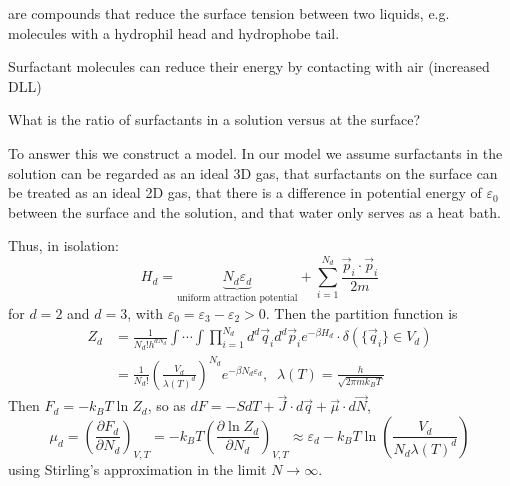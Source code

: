 \documentclass[12pt, a4paper, oneside, openright, titlepage]{book}
\begin{document}
\begin{defn}
     are compounds that reduce the surface tension between two liquids, e.g. molecules with a hydrophil head and hydrophobe tail.
\end{defn}

Surfactant molecules can reduce their energy by contacting with air (increased DLL)

\begin{qst}
    What is the ratio of surfactants in a solution versus at the surface?
\end{qst}

To answer this we construct a model. In our model we assume surfactants in the solution can be regarded as an ideal 3D gas, that surfactants on the surface can be treated as an ideal 2D gas, that there is a difference in potential energy of $\varepsilon_0$ between the surface and the solution, and that water only serves as a heat bath.

Thus, in isolation: $$H_d = \underbrace{N_d\varepsilon_d}_{\text{uniform attraction potential}} + \sum_{i=1}^{N_d}\frac{\vec{p}_i\cdot\vec{p}_i}{2m}$$ for $d = 2$ and $d = 3$, with $\varepsilon_0 = \varepsilon_3 - \varepsilon_2 > 0$. Then the partition function is  \begin{align*}
    Z_d &= \frac{1}{N_d!h^{dN_d}}\int\cdots \int \prod_{i=1}^{N_d}d^d\vec{q}_id^d\vec{p}_ie^{-\beta H_d}\cdot\delta(\{\vec{q}_i\}\in V_d) \\
    &= \frac{1}{N_d!}\left(\frac{V_d}{\lambda(T)^d}\right)^{N_d}e^{-\beta N_d\varepsilon_d},\;\;\lambda(T) = \frac{h}{\sqrt{2\pi mk_BT}}
\end{align*}
Then $F_d = -k_BT\ln Z_d$, so as $dF = -SdT + \vec{J}\cdot d\vec{q}+\vec{\mu}\cdot d\vec{N}$, $$\mu_d = \left(\frac{\partial F_d}{\partial N_d}\right)_{V,T} = -k_BT\left(\frac{\partial\ln Z_d}{\partial N_d}\right)_{V,T} \approx \varepsilon_d - k_BT\ln\left(\frac{V_d}{N_d\lambda(T)^d}\right)$$
using Stirling's approximation in the limit $N\rightarrow \infty$.
\end{document}
